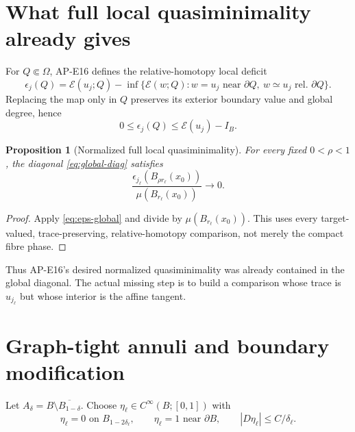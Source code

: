 \documentclass[10pt]{article}
\newtheorem{proposition}[theorem]{Proposition}
\newcommand{\cE}{\mathcal E}
\begin{document}
\section{What full local quasiminimality already gives}

For $Q\Subset\Omega$, AP-E16 defines the relative-homotopy local deficit
\begin{equation}
 \epsilon_j(Q)=\cE(u_j;Q)-
 \inf\{\cE(w;Q):w=u_j\text{ near }\partial Q,\
 w\simeq u_j\text{ rel. }\partial Q\}.                  \label{eq:eps}
\end{equation}
Replacing the map only in $Q$ preserves its exterior boundary value and
global degree, hence
\begin{equation}
 0\leq\epsilon_j(Q)\leq\cE(u_j)-I_B.                    \label{eq:eps-global}
\end{equation}

\begin{proposition}[Normalized full local quasiminimality]
For every fixed $0<\rho<1$, the diagonal
\eqref{eq:global-diag} satisfies
\begin{equation}
 \frac{\epsilon_{j_\ell}(B_{\rho r_\ell}(x_0))}
      {\mu(B_{r_\ell}(x_0))}\longrightarrow0.            \label{eq:normalized-eps}
\end{equation}
\end{proposition}

\begin{proof}
Apply \eqref{eq:eps-global} and divide by
$\mu(B_{r_\ell}(x_0))$.  This uses every target-valued, trace-preserving,
relative-homotopy comparison, not merely the compact fibre phase.
\end{proof}

Thus AP-E16's desired normalized quasiminimality was already contained in
the global diagonal.  The actual missing step is to build a comparison whose
trace is $u_{j_\ell}$ but whose interior is the affine tangent.

\section{Graph-tight annuli and boundary modification}

Let $A_\delta=B\setminus\overline{B_{1-\delta}}$.  Choose
$\eta_\ell\in C^\infty(B;[0,1])$ with
\begin{equation}
 \eta_\ell=0\text{ on }B_{1-2\delta_\ell},\qquad
 \eta_\ell=1\text{ near }\partial B,\qquad
 |D\eta_\ell|\leq C/\delta_\ell.                         \label{eq:eta}
\end{equation}
\end{document}
